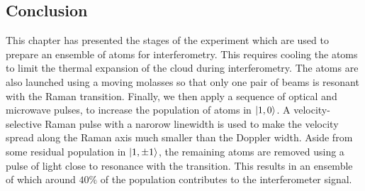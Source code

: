 \subsection{Conclusion}
This chapter has presented the stages of the experiment which are used to prepare an ensemble of atoms for interferometry. This requires cooling the atoms to limit the thermal expansion of the cloud during interferometry. The atoms are also launched using a moving molasses so that only one pair of beams is resonant with the Raman transition. Finally, we then apply a sequence of optical and microwave pulses, to increase the population of atoms in \(\ket{1,0}\). A velocity-selective Raman pulse with a narorow linewidth is used to make the velocity spread along the Raman axis much smaller than the Doppler width. Aside from some residual population in \(\ket{1,\pm 1}\), the remaining atoms are removed using a pulse of light close to resonance with the  transition. This results in an ensemble of which around \(40\%\) of the population contributes to the interferometer signal.


